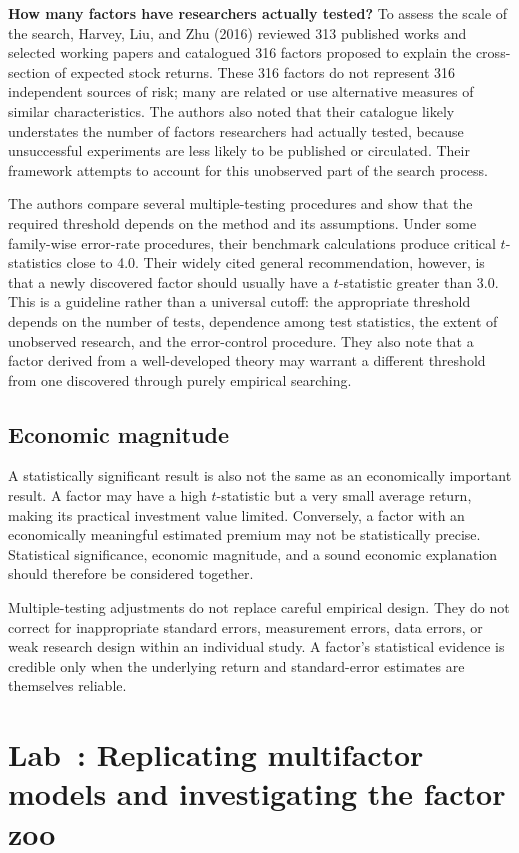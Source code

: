 \textbf{How many factors have researchers actually tested?}
To assess the scale of the search, Harvey, Liu, and Zhu (2016) reviewed 313 published works and selected working papers and catalogued 316 factors proposed to explain the cross-section of expected stock returns. These 316 factors do not represent 316 independent sources of risk; many are related or use alternative measures of similar characteristics. The authors also noted that their catalogue likely understates the number of factors researchers had actually tested, because unsuccessful experiments are less likely to be published or circulated. Their framework attempts to account for this unobserved part of the search process.

The authors compare several multiple-testing procedures and show that the required threshold depends on the method and its assumptions. Under some family-wise error-rate procedures, their benchmark calculations produce critical $t$-statistics close to 4.0. Their widely cited general recommendation, however, is that a newly discovered factor should usually have a $t$-statistic greater than 3.0. This is a guideline rather than a universal cutoff: the appropriate threshold depends on the number of tests, dependence among test statistics, the extent of unobserved research, and the error-control procedure. They also note that a factor derived from a well-developed theory may warrant a different threshold from one discovered through purely empirical searching.

\subsection{Economic magnitude}
A statistically significant result is also not the same
as an economically important result. A factor may have a
high $t$-statistic but a very small average return, making
its practical investment value limited. Conversely, a
factor with an economically meaningful estimated premium
may not be statistically precise. Statistical significance,
economic magnitude, and a sound economic explanation
should therefore be considered together.

Multiple-testing adjustments do not replace careful empirical design. They do not correct for inappropriate standard errors, measurement errors, data errors, or weak research design within an individual study. A factor's statistical evidence is credible only when the underlying return and standard-error estimates are themselves reliable. 

\section{Lab~\thechapter: Replicating multifactor models and investigating the factor zoo}
\label{sec:03-lab}

